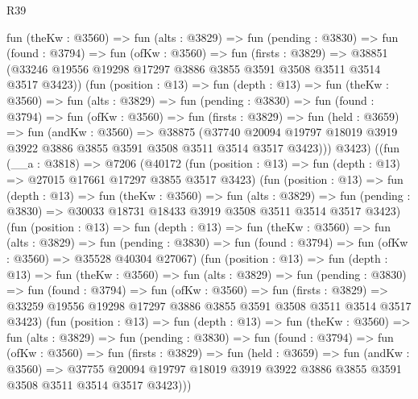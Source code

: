 \begin{lexlean}{R39}
\begin{coremodule}
          fun (theKw : @3560) =>
          fun (alts : @3829) =>
          fun (pending : @3830) =>
          fun (found : @3794) =>
          fun (ofKw : @3560) =>
          fun (firsts : @3829) =>
          @38851 (@33246 @19556 @19298 @17297 @3886 @3855 @3591 @3508 @3511 @3514 @3517 @3423))
          (fun (position : @13) =>
          fun (depth : @13) =>
          fun (theKw : @3560) =>
          fun (alts : @3829) =>
          fun (pending : @3830) =>
          fun (found : @3794) =>
          fun (ofKw : @3560) =>
          fun (firsts : @3829) =>
          fun (held : @3659) =>
          fun (andKw : @3560) =>
          @38875
            (@37740
              @20094
              @19797
              @18019
              @3919
              @3922
              @3886
              @3855
              @3591
              @3508
              @3511
              @3514
              @3517
              @3423)))
          @3423)
        ((fun (__a : @3818) =>
        @7206
          (@40172
            (fun (position : @13) => fun (depth : @13) => @27015 @17661 @17297 @3855 @3517 @3423)
            (fun (position : @13) =>
            fun (depth : @13) =>
            fun (theKw : @3560) =>
            fun (alts : @3829) =>
            fun (pending : @3830) => @30033 @18731 @18433 @3919 @3508 @3511 @3514 @3517 @3423)
            (fun (position : @13) =>
            fun (depth : @13) =>
            fun (theKw : @3560) =>
            fun (alts : @3829) =>
            fun (pending : @3830) =>
            fun (found : @3794) => fun (ofKw : @3560) => @35528 @40304 @27067)
            (fun (position : @13) =>
            fun (depth : @13) =>
            fun (theKw : @3560) =>
            fun (alts : @3829) =>
            fun (pending : @3830) =>
            fun (found : @3794) =>
            fun (ofKw : @3560) =>
            fun (firsts : @3829) =>
            @33259 @19556 @19298 @17297 @3886 @3855 @3591 @3508 @3511 @3514 @3517 @3423)
            (fun (position : @13) =>
            fun (depth : @13) =>
            fun (theKw : @3560) =>
            fun (alts : @3829) =>
            fun (pending : @3830) =>
            fun (found : @3794) =>
            fun (ofKw : @3560) =>
            fun (firsts : @3829) =>
            fun (held : @3659) =>
            fun (andKw : @3560) =>
            @37755
              @20094
              @19797
              @18019
              @3919
              @3922
              @3886
              @3855
              @3591
              @3508
              @3511
              @3514
              @3517
              @3423)))

\end{coremodule}
\end{lexlean}
